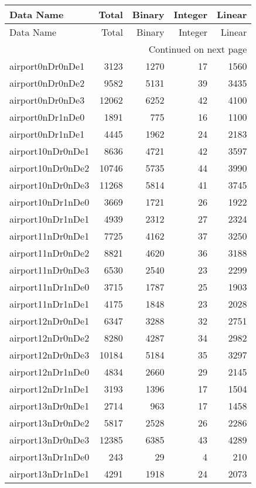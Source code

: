 
\begin{longtable}{lrrrr}
\toprule
Data Name & Total & Binary & Integer & Linear \\
\midrule
\endfirsthead
\toprule
Data Name & Total & Binary & Integer & Linear \\
\midrule
\endhead
\midrule
\multicolumn{5}{r}{Continued on next page} \\
\midrule
\endfoot
\bottomrule
\endlastfoot
airport0nDr0nDe1 & 3123 & 1270 & 17 & 1560 \\
airport0nDr0nDe2 & 9582 & 5131 & 39 & 3435 \\
airport0nDr0nDe3 & 12062 & 6252 & 42 & 4100 \\
airport0nDr1nDe0 & 1891 & 775 & 16 & 1100 \\
airport0nDr1nDe1 & 4445 & 1962 & 24 & 2183 \\
airport10nDr0nDe1 & 8636 & 4721 & 42 & 3597 \\
airport10nDr0nDe2 & 10746 & 5735 & 44 & 3990 \\
airport10nDr0nDe3 & 11268 & 5814 & 41 & 3745 \\
airport10nDr1nDe0 & 3669 & 1721 & 26 & 1922 \\
airport10nDr1nDe1 & 4939 & 2312 & 27 & 2324 \\
airport11nDr0nDe1 & 7725 & 4162 & 37 & 3250 \\
airport11nDr0nDe2 & 8821 & 4620 & 36 & 3188 \\
airport11nDr0nDe3 & 6530 & 2540 & 23 & 2299 \\
airport11nDr1nDe0 & 3715 & 1787 & 25 & 1903 \\
airport11nDr1nDe1 & 4175 & 1848 & 23 & 2028 \\
airport12nDr0nDe1 & 6347 & 3288 & 32 & 2751 \\
airport12nDr0nDe2 & 8280 & 4287 & 34 & 2982 \\
airport12nDr0nDe3 & 10184 & 5184 & 35 & 3297 \\
airport12nDr1nDe0 & 4834 & 2660 & 29 & 2145 \\
airport12nDr1nDe1 & 3193 & 1396 & 17 & 1504 \\
airport13nDr0nDe1 & 2714 & 963 & 17 & 1458 \\
airport13nDr0nDe2 & 5817 & 2528 & 26 & 2286 \\
airport13nDr0nDe3 & 12385 & 6385 & 43 & 4289 \\
airport13nDr1nDe0 & 243 & 29 & 4 & 210 \\
airport13nDr1nDe1 & 4291 & 1918 & 24 & 2073 \\

\end{longtable}
